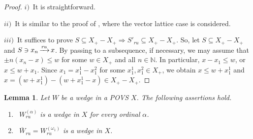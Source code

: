 \documentclass[10pt]{article}
\newtheorem{lemma}{Lemma}[section]
\DeclareMathOperator{\convr}{\xrightarrow[]{{\it ru}}}
\renewcommand{\a}{\alpha}
\newcommand{\w}{\omega}
\begin{document}
\begin{proof}
$i)$\
It is straightforward.

\medskip
$ii)$\
It is similar to the proof of \cite[Theorem 3.3]{LM-1967}, where the vector lattice case is considered.

\medskip
$iii)$\
It suffices to prove $S\subseteq X_+-X_+\Longrightarrow S'_{ru}\subseteq X_+-X_+$. So, let $S\subseteq X_+-X_+$
and $S\ni x_n\convr x$. By passing to a subsequence, if necessary, we may assume that 
$\pm n(x_n-x)\leqslant w$ for some $w\in X_+$ and all $n\in\mathbb{N}$. 
In particular, $x-x_1\leqslant w$, or $x\leqslant w+x_1$. Since $x_1=x_1^1-x_1^2$ for some $x_1^1,x_1^2\in X_+$, we obtain $x\leqslant w+x_1^1$ and 
$x=(w+x_1^1)-(w+x_1^1-x)\in X_+-X_+$.
\end{proof}

\begin{lemma}\label{Lemma-2_3}
Let $W$ be a wedge in a POVS $X$. The following assertions hold.
\begin{enumerate}[$i)$]
\item\
$W^{({\a})}_{ru}$ is a wedge in $X$ for every ordinal ${\a}$.
\item\
$\overline{W}_{ru}=W^{({\w}_1)}_{ru}$ is a wedge in $X$.
\end{enumerate}
\end{lemma}
\end{document}
